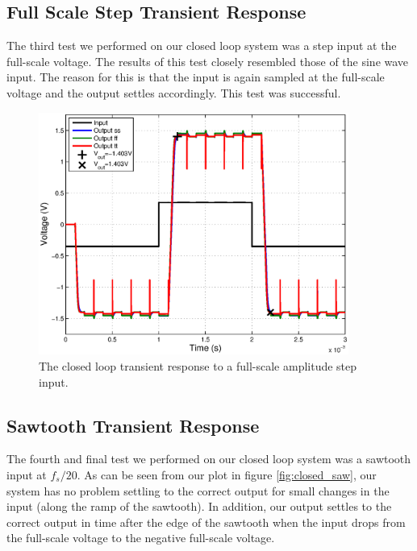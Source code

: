 \documentclass[journal]{IEEEtran}
\begin{document}
\subsection{Full Scale Step Transient Response}
The third test we performed on our closed loop system was a step input at the full-scale voltage. The results of this test closely resembled those of the sine wave input. The reason for this is that the input is again sampled at the full-scale voltage and the output settles accordingly. This test was successful.

\begin{figure}
\centering
\includegraphics[width=4in]{Plots/closed_large_step.eps}
\caption{The closed loop transient response to a full-scale amplitude step input.}
\label{fig:closed_large_step}
\end{figure}

\subsection{Sawtooth Transient Response}
The fourth and final test we performed on our closed loop system was a sawtooth input at $f_s/20$. As can be seen from our plot in figure \ref{fig:closed_saw}, our system has no problem settling to the correct output for small changes in the input (along the ramp of the sawtooth). In addition, our output settles to the correct output in time after the edge of the sawtooth when the input drops from the full-scale voltage to the negative full-scale voltage.
\end{document}
